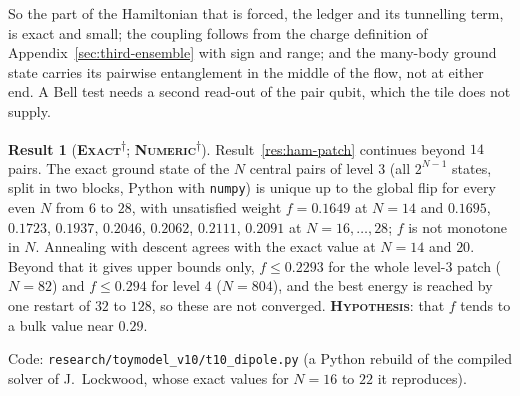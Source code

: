 \documentclass[11pt]{article}
\newcommand{\exact}{\textbf{\textsc{Exact}}}
\newcommand{\numeric}{\textbf{\textsc{Numeric}}}
\newcommand{\hypo}{\textbf{\textsc{Hypothesis}}}
\newcommand{\snap}{\textsuperscript{$\dagger$}}      %
\theoremstyle{definition}
\newtheorem{result}{Result}
\begin{document}
So the part of the Hamiltonian that is forced, the ledger and its tunnelling term, is exact and small; the coupling follows from the charge definition of Appendix~\ref{sec:third-ensemble} with sign and range; and the many-body ground state carries its pairwise entanglement in the middle of the flow, not at either end. A Bell test needs a second read-out of the pair qubit, which the tile does not supply.


\begin{result}[\exact\snap; \numeric\snap]\label{res:ham-dipole-large}
Result~\ref{res:ham-patch} continues beyond $14$ pairs. The exact ground state of the $N$ central pairs of level $3$ (all $2^{N-1}$ states, split in two blocks, Python with \texttt{numpy}) is unique up to the global flip for every even $N$ from $6$ to $28$, with unsatisfied weight $f=0.1649$ at $N=14$ and $0.1695$, $0.1723$, $0.1937$, $0.2046$, $0.2062$, $0.2111$, $0.2091$ at $N=16,\dots,28$; $f$ is not monotone in $N$. Annealing with descent agrees with the exact value at $N=14$ and $20$. Beyond that it gives upper bounds only, $f\le0.2293$ for the whole level-$3$ patch ($N=82$) and $f\le0.294$ for level $4$ ($N=804$), and the best energy is reached by one restart of $32$ to $128$, so these are not converged. \hypo: that $f$ tends to a bulk value near $0.29$.
\end{result}
Code: \texttt{research/toymodel\_v10/t10\_dipole.py} (a Python rebuild of the compiled solver of J.~Lockwood, whose exact values for $N=16$ to $22$ it reproduces).
\end{document}
